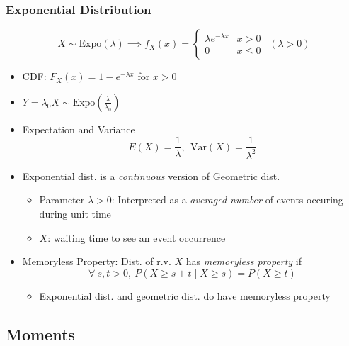 \subsubsection*{Exponential Distribution}
\begin{equation}
    X\sim\text{Expo}(\lambda)\implies f_X(x)=\begin{cases}
        \lambda e^{-\lambda x} & x>0 \\
        0 & x\leq 0
    \end{cases}~~(\lambda>0)
\end{equation}
\begin{itemize}
    \item CDF: $F_X(x)=1-e^{-\lambda x}$ for $x>0$
    \item $Y=\lambda_0X\sim\text{Expo}\left(\frac{\lambda}{\lambda_0}\right)$
    \item Expectation and Variance
    \begin{equation}
        E(X)=\frac{1}{\lambda},~~\text{Var}(X)=\frac{1}{\lambda^2}
    \end{equation}
    \item Exponential dist. is a \textit{continuous} version of Geometric dist.
    \begin{itemize}
        \item Parameter $\lambda>0$: Interpreted as a \textit{averaged number} of events occuring during unit time
        \item $X$: waiting time to see an event occurrence
    \end{itemize}
    \item Memoryless Property: Dist. of r.v. $X$ has \textit{memoryless property} if
    \begin{equation}
        \forall~s,t>0,~P(X\geq s+t\mid X\geq s)=P(X\geq t)
    \end{equation}
    \begin{itemize}
        \item Exponential dist. and geometric dist. do have memoryless property
    \end{itemize}
\end{itemize}

\subsection{Moments}

